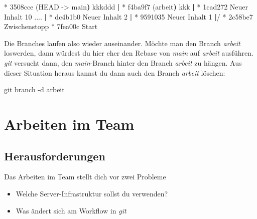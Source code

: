 \documentclass[
  letterpaper,
  DIV=11]{scrreprt}
\newenvironment{Shaded}{\begin{snugshade}}{\end{snugshade}}
\newcommand{\AttributeTok}[1]{\textcolor[rgb]{0.40,0.45,0.13}{#1}}
\newcommand{\ErrorTok}[1]{\textcolor[rgb]{0.68,0.00,0.00}{#1}}
\newcommand{\ExtensionTok}[1]{\textcolor[rgb]{0.00,0.23,0.31}{#1}}
\newcommand{\FunctionTok}[1]{\textcolor[rgb]{0.28,0.35,0.67}{#1}}
\newcommand{\KeywordTok}[1]{\textcolor[rgb]{0.00,0.23,0.31}{\textbf{#1}}}
\newcommand{\NormalTok}[1]{\textcolor[rgb]{0.00,0.23,0.31}{#1}}
\newcommand{\OperatorTok}[1]{\textcolor[rgb]{0.37,0.37,0.37}{#1}}
\providecommand{\tightlist}{%
  \setlength{\itemsep}{0pt}\setlength{\parskip}{0pt}}\usepackage{longtable,booktabs,array}
\newcommand{\git}{\textit{git}\xspace}
\newcommand{\branch}[1]{\textit{#1}\xspace}
\begin{document}
\begin{Shaded}
\begin{Highlighting}[]
\ExtensionTok{*}\NormalTok{ 3508cce }\ErrorTok{(}\ExtensionTok{HEAD} \AttributeTok{{-}}\OperatorTok{\textgreater{}}\NormalTok{ main}\KeywordTok{)} \ExtensionTok{kkkddd}
\KeywordTok{|} \ExtensionTok{*}\NormalTok{ f4ba9f7 }\ErrorTok{(}\ExtensionTok{arbeit}\KeywordTok{)} \ExtensionTok{kkk}
\KeywordTok{|} \ExtensionTok{*}\NormalTok{ 1cad272 Neuer Inhalt 10}
\ExtensionTok{....}
\KeywordTok{|} \ExtensionTok{*}\NormalTok{ dc4b1b0 Neuer Inhalt 2}
\KeywordTok{|} \ExtensionTok{*}\NormalTok{ 9591035 Neuer Inhalt 1}
\KeywordTok{|}\ExtensionTok{/}  
\ExtensionTok{*}\NormalTok{ 2c58be7 Zwischenstopp}
\ExtensionTok{*}\NormalTok{ 7fea00c Start}
\end{Highlighting}
\end{Shaded}

Die Branches laufen also wieder auseinander. Möchte man den Branch
\branch{arbeit} loswerden, dann würdest du hier eher den Rebase von
\branch{main} auf \branch{arbeit} ausführen. \git versucht dann, den
\branch{main}-Branch hinter den Branch \branch{arbeit} zu hängen. Aus
dieser Situation heraus kannst du dann auch den Branch \branch{arbeit}
löschen:

\begin{Shaded}
\begin{Highlighting}[]
\FunctionTok{git}\NormalTok{ branch }\AttributeTok{{-}d}\NormalTok{ arbeit }
\end{Highlighting}
\end{Shaded}


\chapter{Arbeiten im Team}\label{arbeiten-im-team}

\section{Herausforderungen}\label{herausforderungen}

Das Arbeiten im Team stellt dich vor zwei Probleme

\begin{itemize}
\tightlist
\item
  Welche Server-Infrastruktur sollst du verwenden?
\item
  Was ändert sich am Workflow in \git 
\end{itemize}
\end{document}
